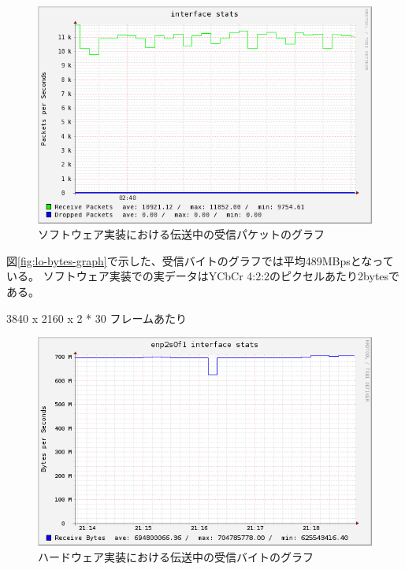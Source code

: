\begin{figure}[htbp]
  \begin{center}
    \includegraphics[bb=0 0 597 388,width=12cm]{img/lo-packets-graph.png}
  \end{center}
  \caption{ソフトウェア実装における伝送中の受信パケットのグラフ}
  \label{fig:lo-packets-graph}
\end{figure}

図\ref{fig:lo-bytes-graph}で示した、受信バイトのグラフでは平均489MBpsとなっている。
ソフトウェア実装での実データはYCbCr 4:2:2のピクセルあたり2bytesである。

3840 x 2160 x 2 * 30
フレームあたり

\begin{figure}[htbp]
  \begin{center}
    \includegraphics[bb=0 0 597 374,width=12cm]{img/enp2s0f1-bytes-graph.png}
  \end{center}
  \caption{ハードウェア実装における伝送中の受信バイトのグラフ}
  \label{fig:enp2s0f1-bytes-graph}
\end{figure}

